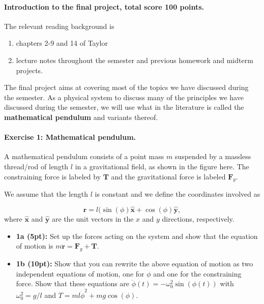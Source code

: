 \documentclass[%
oneside,                 %
final,                   %
10pt]{article}
\begin{document}
\noindent
\paragraph{Introduction to the final project, total score 100 points.}
The relevant reading background is
\begin{enumerate}
\item chapters 2-9 and 14 of Taylor

\item lecture notes throughout the semester and previous homework and midterm projects.
\end{enumerate}

\noindent
The final project aims at covering most of the topics we have discussed during the semester. As a physical system to discuss many of the principles we have discussed during the semester, we will use what in the literature is called the \textbf{mathematical pendulum} and variants thereof. 

\paragraph{Exercise 1: Mathematical pendulum.}
A mathematical pendulum consists of a point mass $m$ suspended by a massless thread/rod of length $l$ in a gravitational field, as shown in the figure here. The constraining force is labeled by $\bm{T}$
and the gravitational force is labeled $\bm{F}_g$.


We assume that the length $l$ is constant and we define the coordinates involved as

\[
\bm{r} = l(\sin(\phi)\bm{\hat{x}}+\cos(\phi)\bm{\hat{y}},
\]
where $\bm{\hat{x}}$ and $\bm{\hat{y}}$ are the unit vectors in the $x$ and $y$ directions, respectively.

\begin{itemize}
\item \textbf{1a (5pt):} Set up the forces acting on the system and show that the equation of motion is $m\ddot{\bm{r}}=\bm{F}_g+\bm{T}$.

\item \textbf{1b (10pt):} Show that you can rewrite the above equation of motion as two independent equations of motion, one for $\phi$ and one for the constraining force. Show that these equations are $\ddot{\phi}(t)=-\omega_0^2\sin{(\phi(t))}$ with $\omega_0^2=g/l$ and $T=ml\dot{\phi}^2+mg\cos{(\phi)}$.
\end{itemize}
\end{document}
